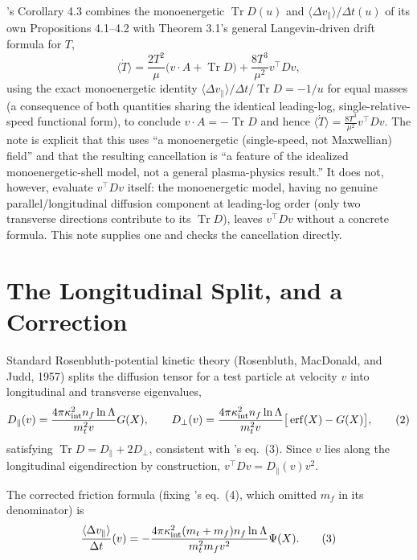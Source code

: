 \documentclass[12pt]{amsart}
\theoremstyle{plain}
\theoremstyle{remark}
\begin{document}
\cite{Ebert2026Bath}'s Corollary 4.3 combines the monoenergetic $\operatorname{Tr}D(u)$ and $\langle\Delta v_\parallel\rangle/\Delta t(u)$ of its own Propositions 4.1--4.2 with Theorem 3.1's general Langevin-driven drift formula for $T$,
\begin{equation}
\langle\dot T\rangle = \frac{2T^2}{\mu}\big(v\cdot A+\operatorname{Tr}D\big) + \frac{8T^3}{\mu^2}v^\top Dv, \tag{1}
\end{equation}
using the exact monoenergetic identity $\langle\Delta v_\parallel\rangle/\Delta t\big/\operatorname{Tr}D=-1/u$ for equal masses (a consequence of both quantities sharing the identical leading-log, single-relative-speed functional form), to conclude $v\cdot A=-\operatorname{Tr}D$ and hence $\langle\dot T\rangle=\tfrac{8T^3}{\mu^2}v^\top Dv$. The note is explicit that this uses ``a monoenergetic (single-speed, not Maxwellian) field'' and that the resulting cancellation is ``a feature of the idealized monoenergetic-shell model, not a general plasma-physics result.'' It does not, however, evaluate $v^\top Dv$ itself: the monoenergetic model, having no genuine parallel/longitudinal diffusion component at leading-log order (only two transverse directions contribute to its $\operatorname{Tr}D$), leaves $v^\top Dv$ without a concrete formula. This note supplies one and checks the cancellation directly.

\section{The Longitudinal Split, and a Correction}

Standard Rosenbluth-potential kinetic theory (Rosenbluth, MacDonald, and Judd, 1957) splits the diffusion tensor for a test particle at velocity $v$ into longitudinal and transverse eigenvalues,
\begin{equation}
D_\parallel(v) = \frac{4\pi\kappa_{\rm int}^2n_f\ln\Lambda}{m_t^2v}G(X), \qquad D_\perp(v) = \frac{4\pi\kappa_{\rm int}^2n_f\ln\Lambda}{m_t^2v}\big[\operatorname{erf}(X)-G(X)\big], \tag{2}
\end{equation}
satisfying $\operatorname{Tr}D=D_\parallel+2D_\perp$, consistent with \cite{Ebert2026Rosenbluth}'s eq.~(3). Since $v$ lies along the longitudinal eigendirection by construction, $v^\top Dv = D_\parallel(v)v^2$.

The corrected friction formula (fixing \cite{Ebert2026Rosenbluth}'s eq.~(4), which omitted $m_f$ in its denominator) is
\begin{equation}
\frac{\langle\Delta v_\parallel\rangle}{\Delta t}(v) = -\frac{4\pi\kappa_{\rm int}^2(m_t+m_f)n_f\ln\Lambda}{m_t^2m_fv^2}\Psi(X). \tag{3}
\end{equation}
\end{document}
